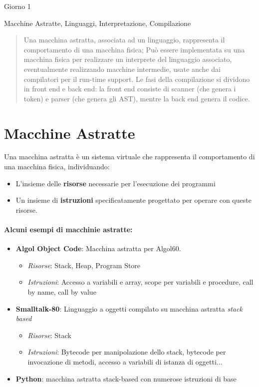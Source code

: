 \documentclass[a4paper,10pt]{article}
\begin{document}
 

\begin{center}
    \LARGE Giorno 1
    
    \Large Macchine Astratte, Linguaggi, Interpretazione, Compilazione
\end{center}\smallskip

\begin{abstract}
    Una macchina astratta, associata ad un linguaggio, rappresenta il comportamento di una macchina fisica; Può essere implementata su una macchina fisica per realizzare un interprete del linguaggio associato, eventualmente realizzando macchine intermedie, usate anche dai compilatori per il run-time support. Le fasi della compilazione si dividono in front end e back end: la front end consiste di scanner (che genera i token) e parser (che genera gli AST), mentre la back end genera il codice.
\end{abstract}

\section{Macchine Astratte}
Una macchina astratta è un sistema virtuale che rappresenta il comportamento di una macchina fisica, individuando:
\begin{itemize}
 \item L'insieme delle \textbf{risorse} necessarie per l'esecuzione dei programmi
 \item Un insieme di \textbf{istruzioni} specificatamente progettato per operare con queste risorse.
\end{itemize}

\paragraph{Alcuni esempi di macchinie astratte:}
\begin{itemize}
 \item \textbf{Algol Object Code}: Macchina astratta per Algol60.
 \begin{itemize}
  \item \emph{Risorse}: Stack, Heap, Program Store
  \item \emph{Istruzioni}: Accesso a variabili e array, scope per variabili e procedure, call by name, call by value
 \end{itemize}
 
 \item \textbf{Smalltalk-80}: Linguaggio a oggetti compilato su macchina astratta \emph{stack based}
 \begin{itemize}
  \item \emph{Risorse}: Stack
  \item \emph{Istruzioni}: Bytecode per manipolazione dello stack, bytecode per invocazione di metodi, accesso a variabili di istanza di oggetti...
 \end{itemize}
 \item \textbf{Python}: macchina astratta stack-based con numerose istruzioni di base
 
\end{itemize}
\end{document}
